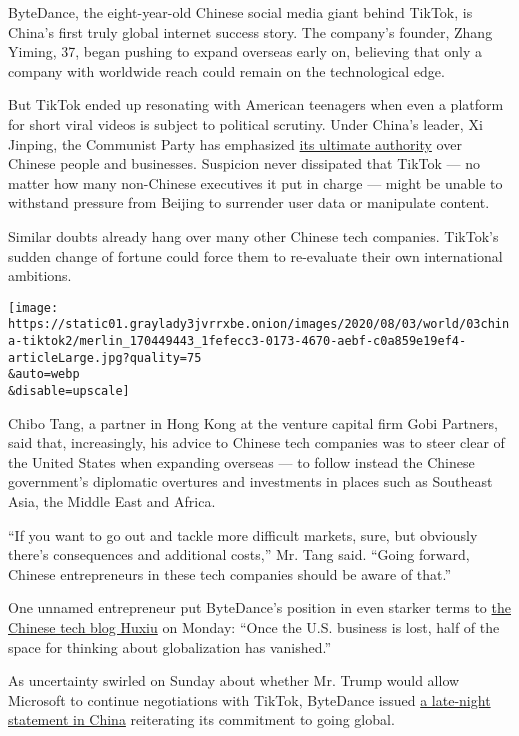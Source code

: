 ByteDance, the eight-year-old Chinese social media giant behind TikTok,
is China's first truly global internet success story. The company's
founder, Zhang Yiming, 37, began pushing to expand overseas early on,
believing that only a company with worldwide reach could remain on the
technological edge.

But TikTok ended up resonating with American teenagers when even a
platform for short viral videos is subject to political scrutiny. Under
China's leader, Xi Jinping, the Communist Party has emphasized
\href{https://www.nytimes3xbfgragh.onion/2018/12/18/world/asia/xi-jinping-speech-china.html}{its
ultimate authority} over Chinese people and businesses. Suspicion never
dissipated that TikTok --- no matter how many non-Chinese executives it
put in charge --- might be unable to withstand pressure from Beijing to
surrender user data or manipulate content.

Similar doubts already hang over many other Chinese tech companies.
TikTok's sudden change of fortune could force them to re-evaluate their
own international ambitions.

\texttt{[image: https://static01.graylady3jvrrxbe.onion/images/2020/08/03/world/03china-tiktok2/merlin\_170449443\_1fefecc3-0173-4670-aebf-c0a859e19ef4-articleLarge.jpg?quality=75\\\&auto=webp\\\&disable=upscale]}

Chibo Tang, a partner in Hong Kong at the venture capital firm Gobi
Partners, said that, increasingly, his advice to Chinese tech companies
was to steer clear of the United States when expanding overseas --- to
follow instead the Chinese government's diplomatic overtures and
investments in places such as Southeast Asia, the Middle East and
Africa.

``If you want to go out and tackle more difficult markets, sure, but
obviously there's consequences and additional costs,'' Mr. Tang said.
``Going forward, Chinese entrepreneurs in these tech companies should be
aware of that.''

One unnamed entrepreneur put ByteDance's position in even starker terms
to \href{https://m.huxiu.com/article/373071.html}{the Chinese tech blog
Huxiu} on Monday: ``Once the U.S. business is lost, half of the space
for thinking about globalization has vanished.''

As uncertainty swirled on Sunday about whether Mr. Trump would allow
Microsoft to continue negotiations with TikTok, ByteDance issued
\href{https://www.toutiao.com/a1673929179426827}{a late-night statement
in China} reiterating its commitment to going global.

